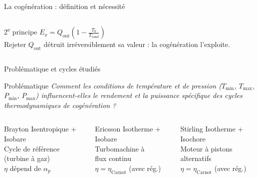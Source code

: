 \documentclass[aspectratio=43, 10pt]{beamer}
\newcommand{\Tmin}{T_{\min}}
\newcommand{\Tmax}{T_{\max}}
\newcommand{\Pmin}{P_{\min}}
\newcommand{\Pmax}{P_{\max}}
\newcommand{\rp}{\alpha_p}
\newcommand{\etaC}{\eta_{\text{Carnot}}}
\newcommand{\Qout}{Q_{\text{out}}}
\begin{document}
\begin{frame}{La cog\'en\'eration : d\'efinition et n\'ecessit\'e}
\begin{columns}[T,onlytextwidth]
      \vspace{0.35em}
      \begin{exampleblock}{2\textsuperscript{e} principe}
        \small
        $E_x = \Qout\!\left(1-\frac{T_0}{T_\text{cond}}\right)$\\[2pt]
        Rejeter $\Qout$ d\'etruit irr\'eversiblement
        sa valeur : la cog\'en\'eration l'exploite.
      \end{exampleblock}
  \end{columns}

\end{frame}

\begin{frame}{Probl\'ematique et cycles \'etudi\'es}

  \begin{alertblock}{Probl\'ematique}
    \centering
    \textit{Comment les conditions de temp\'erature et de pression
    ($\Tmin$, $\Tmax$, $\Pmin$, $\Pmax$)
    influencent-elles le rendement et la puissance sp\'ecifique
    des cycles thermodynamiques de cog\'en\'eration ?}
  \end{alertblock}

  \vspace{0.9em}
  \begin{columns}[T,onlytextwidth]
      \begin{block}{\textcolor{rougeCycle}{Brayton}}
        \small
        Isentropique + Isobare\\[4pt]
        Cycle de r\'ef\'erence\\
        (turbine \`a gaz)\\[4pt]
        $\eta$ d\'epend de $\rp$
      \end{block}

      \begin{block}{\textcolor{bleuPale}{Ericsson}}
        \small
        Isotherme + Isobare\\[4pt]
        Turbomachine \`a\\
        flux continu\\[4pt]
        $\eta = \etaC$ (avec r\'eg.)
      \end{block}

      \begin{block}{\textcolor{vertCycle}{Stirling}}
        \small
        Isotherme + Isochore\\[4pt]
        Moteur \`a pistons\\
        alternatifs\\[4pt]
        $\eta = \etaC$ (avec r\'eg.)
      \end{block}
  \end{columns}


\end{frame}
\end{document}
